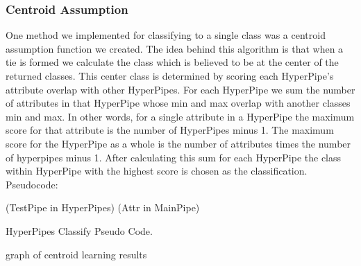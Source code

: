 \subsubsection{Centroid Assumption}
One method we implemented for classifying to a single class was
a centroid assumption function we created. The idea behind this
algorithm is that when a tie is formed we calculate the class 
which is believed to be at the center of the returned classes. 
This center class is determined by scoring each HyperPipe's 
attribute overlap with other HyperPipes. For each HyperPipe we 
sum the number of attributes in that HyperPipe whose min and max 
overlap with another classes min and max. In other words, for a 
single attribute in a HyperPipe the maximum score for that 
attribute is the number of HyperPipes minus 1. The maximum score 
for the HyperPipe as a whole is the number of attributes times 
the number of hyperpipes minus 1. After calculating this sum for 
each HyperPipe the class within HyperPipe with the highest score 
is chosen as the classification. Pseudocode:
\begin{program}
\begin{algorithmic}
\ForAll(TestPipe in HyperPipes)
\ForAll(Attr in MainPipe)
\EndIf
\EndFor
\EndIf
\EndFor
\EndFor
\EndProcedure
\end{algorithmic}
\caption{HyperPipes Classify Pseudo Code.}\label{PseudocodeClass}
\end{program}
graph of centroid learning results

